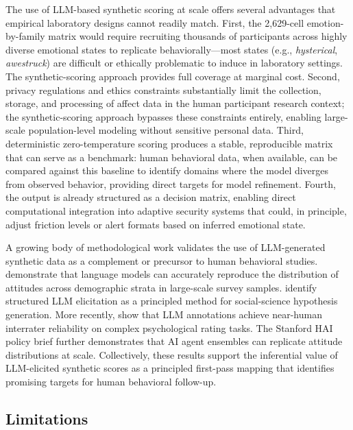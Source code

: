 \documentclass[12pt,a4paper]{article}
\begin{document}
The use of LLM-based synthetic scoring at scale offers several advantages that empirical laboratory designs cannot readily match. First, the 2,629-cell emotion-by-family matrix would require recruiting thousands of participants across highly diverse emotional states to replicate behaviorally---most states (e.g., \textit{hysterical}, \textit{awestruck}) are difficult or ethically problematic to induce in laboratory settings. The synthetic-scoring approach provides full coverage at marginal cost. Second, privacy regulations and ethics constraints substantially limit the collection, storage, and processing of affect data in the human participant research context; the synthetic-scoring approach bypasses these constraints entirely, enabling large-scale population-level modeling without sensitive personal data. Third, deterministic zero-temperature scoring produces a stable, reproducible matrix that can serve as a benchmark: human behavioral data, when available, can be compared against this baseline to identify domains where the model diverges from observed behavior, providing direct targets for model refinement. Fourth, the output is already structured as a decision matrix, enabling direct computational integration into adaptive security systems that could, in principle, adjust friction levels or alert formats based on inferred emotional state.

A growing body of methodological work validates the use of LLM-generated synthetic data as a complement or precursor to human behavioral studies. \citet{argyle2023out} demonstrate that language models can accurately reproduce the distribution of attitudes across demographic strata in large-scale survey samples. \citet{grossmann2023ai} identify structured LLM elicitation as a principled method for social-science hypothesis generation. More recently, \citet{ziems2024can} show that LLM annotations achieve near-human interrater reliability on complex psychological rating tasks. The Stanford HAI policy brief \citep{santurkar2023opinions} further demonstrates that AI agent ensembles can replicate attitude distributions at scale. Collectively, these results support the inferential value of LLM-elicited synthetic scores as a principled first-pass mapping that identifies promising targets for human behavioral follow-up.

\subsection{Limitations}
\label{sec:limitations}
\end{document}
